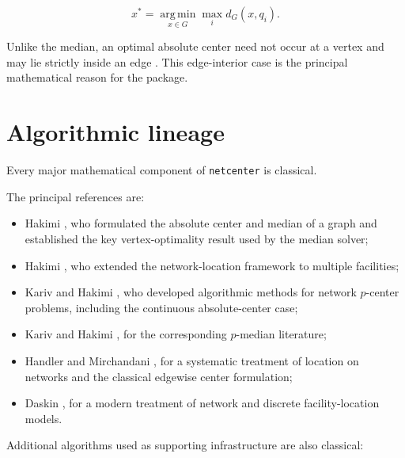 \documentclass[11pt]{article}
\newcommand{\argmin}{\operatorname*{arg\,min}}
\begin{document}
\[
x^*
=
\argmin_{x\in G}
\max_i d_G(x,q_i).
\]

Unlike the median, an optimal absolute center need not occur at a vertex and may
lie strictly inside an edge \cite{Hakimi1964}. This edge-interior case is the
principal mathematical reason for the package.

\section{Algorithmic lineage}

Every major mathematical component of \texttt{netcenter} is classical.

The principal references are:

\begin{itemize}[leftmargin=1.5em]

\item Hakimi \cite{Hakimi1964}, who formulated the absolute center and median
of a graph and established the key vertex-optimality result used by the median
solver;

\item Hakimi \cite{Hakimi1965}, who extended the network-location framework to
multiple facilities;

\item Kariv and Hakimi \cite{KarivHakimi1979a}, who developed algorithmic
methods for network \(p\)-center problems, including the continuous
absolute-center case;

\item Kariv and Hakimi \cite{KarivHakimi1979b}, for the corresponding
\(p\)-median literature;

\item Handler and Mirchandani \cite{HandlerMirchandani1979}, for a systematic
treatment of location on networks and the classical edgewise center
formulation;

\item Daskin \cite{Daskin2013}, for a modern treatment of network and discrete
facility-location models.

\end{itemize}

Additional algorithms used as supporting infrastructure are also classical:
\end{document}
